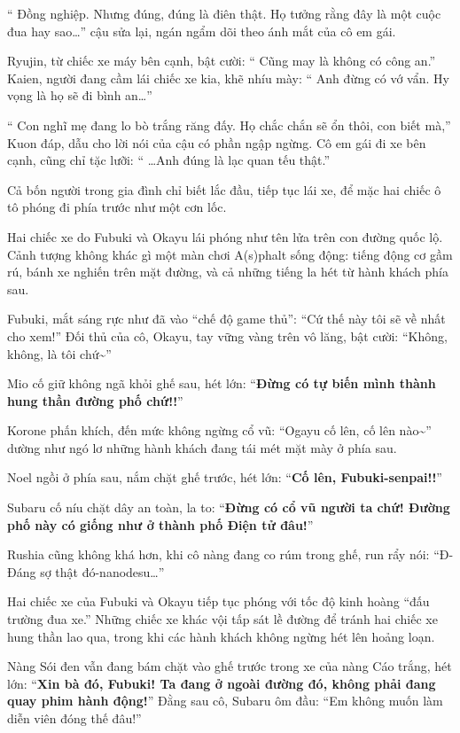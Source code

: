 \documentclass[../main.tex]{subfiles}
\begin{document}
``{\color{red} Đồng nghiệp. Nhưng đúng, đúng là điên thật. Họ tưởng rằng đây là một cuộc đua hay sao\dots}'' cậu sửa lại, ngán ngẩm dõi theo ánh mắt của cô em gái.

Ryujin, từ chiếc xe máy bên cạnh, bật cười: ``{\color{red} Cũng may là không có công an}.'' Kaien, người đang cầm lái chiếc xe kia, khẽ nhíu mày: ``{\color{red} Anh đừng có vớ vẩn. Hy vọng là họ sẽ đi bình an\dots}''

``{\color{red} Con nghĩ mẹ đang lo bò trắng răng đấy. Họ chắc chắn sẽ ổn thôi, con biết mà,}'' Kuon đáp, dẫu cho lời nói của cậu có phần ngập ngừng. Cô em gái đi xe bên cạnh, cũng chỉ tặc lưỡi: ``{\color{red} \dots Anh đúng là lạc quan tếu thật.}''

Cả bốn người trong gia đình chỉ biết lắc đầu, tiếp tục lái xe, để mặc hai chiếc ô tô phóng đi phía trước như một cơn lốc.

\ct

Hai chiếc xe do Fubuki và Okayu lái phóng như tên lửa trên con đường quốc lộ. Cảnh tượng không khác gì một màn chơi A(s)phalt sống động: tiếng động cơ gầm rú, bánh xe nghiến trên mặt đường, và cả những tiếng la hét từ hành khách phía sau.

Fubuki, mắt sáng rực như đã vào ``chế độ game thủ'': ``Cứ thế này tôi sẽ về nhất cho xem!'' Đối thủ của cô, Okayu, tay vững vàng trên vô lăng, bật cười: ``Không, không, là tôi chứ\~{}''

Mio cố giữ không ngã khỏi ghế sau, hét lớn: ``\textbf{Đừng có tự biến mình thành hung thần đường phố chứ!!}''

Korone phấn khích, đến mức không ngừng cổ vũ: ``Ogayu cố lên, cố lên nào\~{}'' dường như ngó lơ những hành khách đang tái mét mặt mày ở phía sau.

Noel ngồi ở phía sau, nắm chặt ghế trước, hét lớn: ``\textbf{Cố lên, Fubuki-senpai!!}''

Subaru cố níu chặt dây an toàn, la to: ``\textbf{Đừng có cổ vũ người ta chứ! Đường phố này có giống như ở thành phố Điện tử đâu!}''

Rushia cũng không khá hơn, khi cô nàng đang co rúm trong ghế, run rẩy nói: ``Đ-Đáng sợ thật đó-nanodesu\dots''

Hai chiếc xe của Fubuki và Okayu tiếp tục phóng với tốc độ kinh hoàng ``đấu trường đua xe.'' Những chiếc xe khác vội tấp sát lề đường để tránh hai chiếc xe hung thần lao qua, trong khi các hành khách không ngừng hét lên hoảng loạn.

Nàng Sói đen vẫn đang bám chặt vào ghế trước trong xe của nàng Cáo trắng, hét lớn: ``\textbf{Xin bà đó, Fubuki! Ta đang ở ngoài đường đó, không phải đang quay phim hành động!}'' Đằng sau cô, Subaru ôm đầu: ``Em không muốn làm diễn viên đóng thế đâu!''
\end{document}
